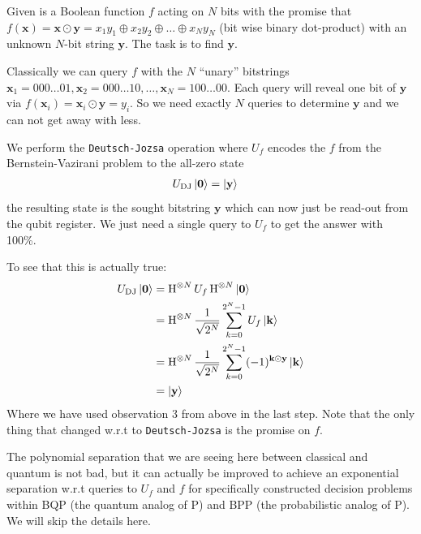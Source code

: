 \begin{def*}
    Given is a Boolean function $f$ acting on $N$ bits with the promise that $f(\mathbf{x}) = \mathbf{x}\odot \mathbf{y} =  x_1y_1 \oplus x_2y_2 \oplus \dots \oplus x_Ny_N$ (bit wise binary dot-product) with an unknown $N$-bit string $\mathbf{y}$. The task is to find $\mathbf{y}$.
\end{def*}

\begin{algo*}
    Classically we can query $f$ with the $N$ ``unary'' bitstrings $\mathbf{x}_1 = 000\dots 01, \mathbf{x}_2 = 000\dots 10, \dots, \mathbf{x}_N = 100\dots 00$. Each query will reveal one bit of $\mathbf{y}$ via $f(\mathbf{x}_i) = \mathbf{x}_i \odot\mathbf{y} = y_i$. So we need exactly $N$ queries to determine $\mathbf{y}$ and we can not get away with less.
\end{algo*}

\begin{algo*}
We perform the \texttt{Deutsch-Jozsa} operation where $U_f$ encodes the $f$ from the Bernstein-Vazirani problem to the all-zero state
    \begin{align}
         {U}_\text{DJ} \ket{\mathbf{0}} &= \ket{\mathbf{y}}
\end{align}
the resulting state is the sought bitstring $\mathbf{y}$ which can now just be read-out from the qubit register.  
We just need a single query to $U_f$ to get the answer with 100\%.
\end{algo*}
To see that this is actually true:
\begin{align}
U_\text{DJ}\ket{\mathbf{0}} &= \operatorname{H}^{\otimes N} U_f \operatorname{H}^{\otimes N}\ket{\mathbf{0}} \nonumber\\
&= \operatorname{H}^{\otimes N} \frac{1}{\sqrt{2^N}} \sum_{k=0}^{2^N-1} U_f\ket{\mathbf{k}} \nonumber\\
&= \operatorname{H}^{\otimes N} \frac{1}{\sqrt{2^N}} \sum_{k=0}^{2^N-1} (-1)^{\mathbf{k}\odot \mathbf{y}}\ket{\mathbf{k}}\nonumber\\
&= \ket{\mathbf{y}}
\end{align}
Where we have used observation 3 from above in the last step. Note that the only thing that changed w.r.t to \texttt{Deutsch-Jozsa}  is the promise on $f$.

The polynomial separation that we are seeing here between classical and quantum is not bad, but it can actually be improved to achieve an exponential separation w.r.t queries to $U_f$ and $f$ for specifically constructed decision problems within BQP (the quantum analog of P) and BPP (the probabilistic analog of P). We will skip the details here.
\clearpage

